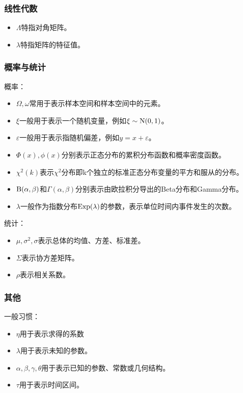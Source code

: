 \subsubsection{线性代数}

\begin{itemize}
\item $\Lambda$特指对角矩阵。
\item $\lambda$特指矩阵的特征值。
\end{itemize}

\subsubsection{概率与统计}

概率：
\begin{itemize}
\item $\Omega,\omega$常用于表示样本空间和样本空间中的元素。
\item $\xi$一般用于表示一个随机变量，例如$\xi\sim{\rm N}(0,1)$。
\item $\varepsilon$一般用于表示指随机偏差，例如$y=x+\varepsilon$。
\item $\Phi(x),\phi(x)$分别表示正态分布的累积分布函数和概率密度函数。
\item $\chi^2(k)$表示$\chi^2$分布即k个独立的标准正态分布变量的平方和服从的分布。
\item ${\rm B(\alpha,\beta)}$和$\Gamma (\alpha,\beta)$分别表示由欧拉积分导出的Beta分布和Gamma分布。
\item $\lambda$一般作为指数分布${\rm Exp}(\lambda)$的参数，表示单位时间内事件发生的次数。
\end{itemize}

统计：
\begin{itemize}
\item $\mu,\sigma^2,\sigma$表示总体的均值、方差、标准差。
\item $\Sigma$表示协方差矩阵。
\item $\rho$表示相关系数。
\end{itemize}


\subsubsection{其他}

一般习惯：

\begin{itemize}
\item $\eta$用于表示求得的系数
\item $\lambda$用于表示未知的参数。
\item $\alpha,\beta,\gamma,\theta$用于表示已知的参数、常数或几何结构。
\item $\tau$用于表示时间区间。
\end{itemize}

